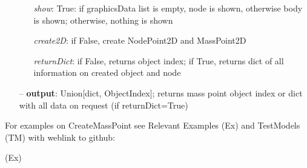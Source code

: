 \begin{itemize}[leftmargin=0.7cm]
\begin{itemize}[leftmargin=1.2cm]
\item[]{\it show}: True: if graphicsData list is empty, node is shown, otherwise body is shown; otherwise, nothing is shown
\item[]{\it create2D}: if False, create NodePoint2D and MassPoint2D
\item[]{\it returnDict}: if False, returns object index; if True, returns dict of all information on created object and node
\end{itemize}
\item[--]
{\bf output}: Union[dict, ObjectIndex]; returns mass point object index or dict with all data on request (if returnDict=True)
\vspace{12pt}\end{itemize}
%

%
\noindent For examples on CreateMassPoint see Relevant Examples (Ex) and TestModels (TM) with weblink to github:
\bi
 \item \footnotesize {} (Ex)
\ei


